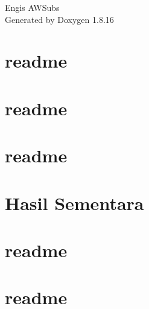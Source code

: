 \let\mypdfximage\pdfximage\def\pdfximage{\immediate\mypdfximage}\documentclass[twoside]{book}
\newcommand{\+}{\discretionary{\mbox{\scriptsize$\hookleftarrow$}}{}{}}
\newcommand{\clearemptydoublepage}{%
  \newpage{\pagestyle{empty}\cleardoublepage}%
}
\begin{document}
\hypersetup{pageanchor=false,
             bookmarksnumbered=true,
             pdfencoding=unicode
            }
\begin{titlepage}
\vspace*{7cm}
\begin{center}%
{\Large Engi\textquotesingle{}s A\+W\+Subs }\\
\vspace*{1cm}
{\large Generated by Doxygen 1.8.16}\\
\end{center}
\end{titlepage}
\clearemptydoublepage
{}
\tableofcontents
\clearemptydoublepage
{}
\hypersetup{pageanchor=true}

\chapter{readme}
\label{md_doc_Dokumentasi_Tugas_Besar_readme}

\chapter{readme}
\label{md_doc_Hasil_Asistensi_readme}

\chapter{readme}
\label{md_doc_Hasil_Generate_Doxygen_readme}

\chapter{Hasil Sementara}
\label{autotoc_md0}

\chapter{readme}
\label{md_doc_Hasil_Pemeriksaan_Kode_readme}

\chapter{readme}
\label{md_doc_readme}

\end{document}
